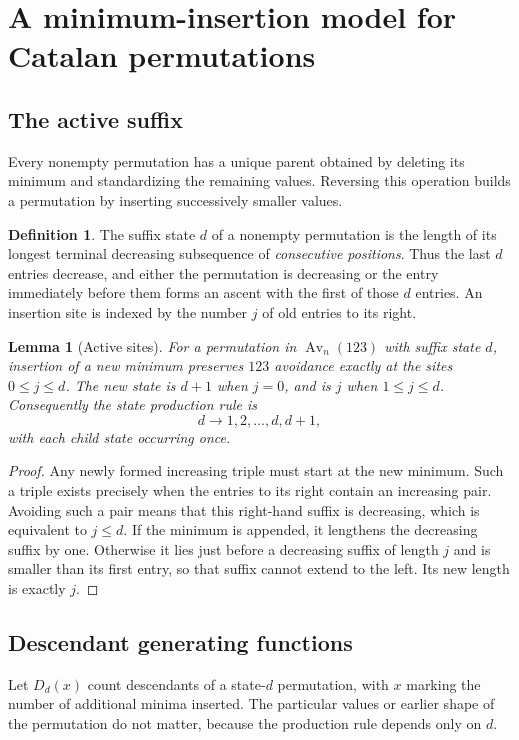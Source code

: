 \documentclass[11pt]{article}
\numberwithin{equation}{section}
\newtheorem{lemma}[theorem]{Lemma}
\theoremstyle{definition}
\newtheorem{definition}[theorem]{Definition}
\newcommand{\Av}{\operatorname{Av}}
\begin{document}
\section{A minimum-insertion model for Catalan permutations}\label{fpf:sec:insertion}

\subsection{The active suffix}
Every nonempty permutation has a unique parent obtained by deleting its
minimum and standardizing the remaining values. Reversing this operation
builds a permutation by inserting successively smaller values.

\begin{definition}
The suffix state $d$ of a nonempty permutation is the length of its longest
terminal decreasing subsequence of \emph{consecutive positions}. Thus the
last $d$ entries decrease, and either the permutation is decreasing or the
entry immediately before them forms an ascent with the first of those $d$
entries. An insertion site is indexed by the number $j$ of old entries to
its right.
\end{definition}

\begin{lemma}[Active sites]\label{fpf:lem:active}
For a permutation in $\Av_n(123)$ with suffix state $d$, insertion of a new
minimum preserves $123$ avoidance exactly at the sites $0\le j\le d$.
The new state is $d+1$ when $j=0$, and is $j$ when $1\le j\le d$.
Consequently the state production rule is
\begin{equation}\label{fpf:eq:production}
 d\longrightarrow 1,2,\ldots,d,d+1,
\end{equation}
with each child state occurring once.
\end{lemma}
\begin{proof}
Any newly formed increasing triple must start at the new minimum. Such a
triple exists precisely when the entries to its right contain an increasing
pair. Avoiding such a pair means that this right-hand suffix is decreasing,
which is equivalent to $j\le d$. If the minimum is appended, it lengthens
the decreasing suffix by one. Otherwise it lies just before a decreasing
suffix of length $j$ and is smaller than its first entry, so that suffix
cannot extend to the left. Its new length is exactly $j$.
\end{proof}

\subsection{Descendant generating functions}
Let $D_d(x)$ count descendants of a state-$d$ permutation, with $x$ marking
the number of additional minima inserted. The particular values or earlier
shape of the permutation do not matter, because the production rule depends
only on $d$.
\end{document}
